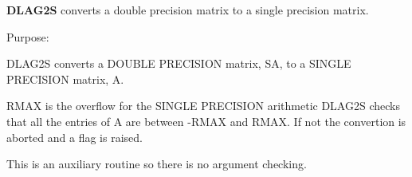 {\bfseries D\+L\+A\+G2\+S} converts a double precision matrix to a single precision matrix. 

 \begin{DoxyParagraph}{Purpose\+: }
\begin{DoxyVerb} DLAG2S converts a DOUBLE PRECISION matrix, SA, to a SINGLE
 PRECISION matrix, A.

 RMAX is the overflow for the SINGLE PRECISION arithmetic
 DLAG2S checks that all the entries of A are between -RMAX and
 RMAX. If not the convertion is aborted and a flag is raised.

 This is an auxiliary routine so there is no argument checking.\end{DoxyVerb}
 
\end{DoxyParagraph}

